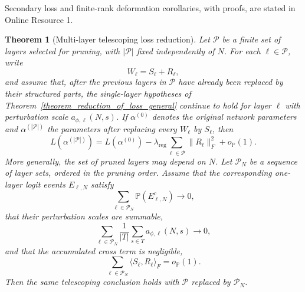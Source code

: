 \documentclass[11pt]{article}
\theoremstyle{plain}
\newtheorem{thm}{Theorem}[section]
\theoremstyle{definition}
\theoremstyle{remark}
\newcommand{\PP}{\mathbb{P}}
\newcommand{\1}{\mathbf{1}}
\begin{document}
Secondary loss and finite-rank deformation corollaries, with proofs, are stated in Online Resource 1.

\begin{thm}[Multi-layer telescoping loss reduction]
\label{thm:multilayer_telescoping}
Let \(\mathcal P\) be a finite set of layers selected for pruning, with \(|\mathcal P|\) fixed independently of \(N\). For each \(\ell\in\mathcal P\), write
\[
W_\ell=S_\ell+R_\ell,
\]
and assume that, after the previous layers in \(\mathcal P\) have already been replaced by their structured parts, the single-layer hypotheses of Theorem~\ref{theorem_reduction_of_loss_general} continue to hold for layer \(\ell\) with perturbation scale \(a_{\phi,\ell}(N,s)\). If \(\alpha^{(0)}\) denotes the original network parameters and \(\alpha^{(|\mathcal P|)}\) the parameters after replacing every \(W_\ell\) by \(S_\ell\), then
\[
L(\alpha^{(|\mathcal P|)})
=
L(\alpha^{(0)})
-\lambda_{\mathrm{reg}}\sum_{\ell\in\mathcal P}\|R_\ell\|_F^2
+o_{\PP}(1).
\]
More generally, the set of pruned layers may depend on \(N\). Let \(\mathcal P_N\) be a sequence of layer sets, ordered in the pruning order. Assume that the corresponding one-layer logit events \(E_{\ell,N}\) satisfy
\[
\sum_{\ell\in\mathcal P_N}\PP(E_{\ell,N}^c)\to0,
\]
that their perturbation scales are summable,
\[
\sum_{\ell\in\mathcal P_N}\frac{1}{|T|}\sum_{s\in T}a_{\phi,\ell}(N,s)\to0,
\]
and that the accumulated cross term is negligible,
\[
\sum_{\ell\in\mathcal P_N}\langle S_\ell,R_\ell\rangle_F=o_{\PP}(1).
\]
Then the same telescoping conclusion holds with \(\mathcal P\) replaced by \(\mathcal P_N\).
\end{thm}
\end{document}
